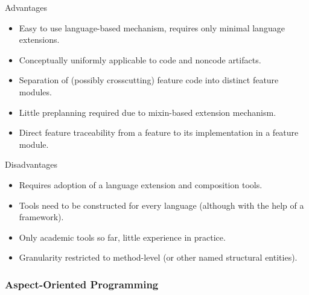 \begin{frame}{\myframetitle}
	\begin{mycolumns}[widths={50,50},animation=none]
		\begin{note}{Advantages}
			\begin{itemize}
				\item Easy to use language-based mechanism, requires only minimal language extensions.
				\item Conceptually uniformly applicable to code and noncode artifacts.
				\item Separation of (possibly crosscutting) feature code into distinct feature modules.
				\item Little preplanning required due to mixin-based extension mechanism.
				\item Direct feature traceability from a feature to its implementation in a feature module.
			\end{itemize}
		\end{note}
	\mynextcolumn
		\begin{note}{Disadvantages}
			\begin{itemize}
				\item Requires adoption of a language extension and composition tools.
				\item Tools need to be constructed for every language (although with the help of a framework).
				\item Only academic tools so far, little experience in practice.
				\item Granularity restricted to method-level (or other named structural entities).
			\end{itemize}
		\end{note}
	\end{mycolumns}
\end{frame}

\subsubsection*{Aspect-Oriented Programming}

